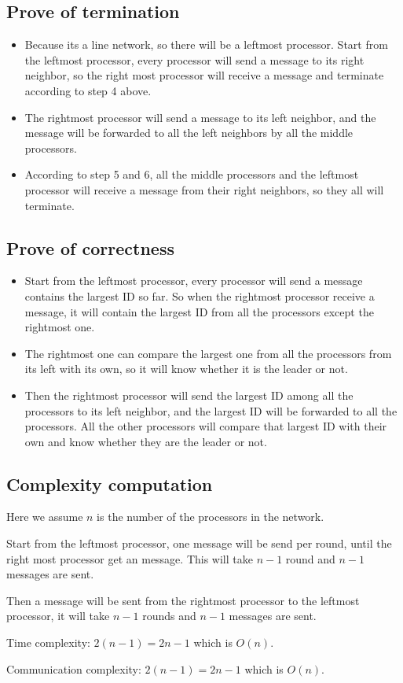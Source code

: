 \documentclass[paper=a4, fontsize=11pt]{scrartcl} %
\numberwithin{equation}{section} %
\numberwithin{figure}{section} %
\numberwithin{table}{section} %
\begin{document}
\subsection*{Prove of termination}
\begin{itemize}
	\item Because its a line network, so there will be a leftmost processor. Start from the leftmost processor, every processor will send a message to its right neighbor, so the right most processor will receive a message and terminate according to step 4 above. 
	\item The rightmost processor will send a message to its left neighbor, and the message will be forwarded to all the left neighbors by all the middle processors. 
	\item According to step 5 and 6, all the middle processors and the leftmost processor will receive a message from their right neighbors, so they all will terminate.
\end{itemize}
\subsection*{Prove of correctness}
\begin{itemize}
	\item Start from the leftmost processor, every processor will send a message contains the largest ID so far. So when the rightmost processor receive a message, it will contain the largest ID from all the processors except the rightmost one. 
	\item The rightmost one can compare the largest one from all the processors from its left with its own, so it will know whether it is the leader or not. 
	\item Then the rightmost processor will send the largest ID among all the processors to its left neighbor, and the largest ID will be forwarded to all the processors. All the other processors will compare that largest ID with their own and know whether they are the leader or not. 
\end{itemize}
\subsection*{Complexity computation}
Here we assume $n$ is the number of the processors in the network.

Start from the leftmost processor, one message will be send per round, until the right most processor get an message. This will take $n - 1$ round and $n - 1$ messages are sent.

Then a message will be sent from the rightmost processor to the leftmost processor, it will take $n - 1$ rounds and $n - 1$ messages are sent.

Time complexity: $2(n - 1) = 2n - 1$ which is $O(n)$.

Communication complexity:  $2(n - 1) = 2n - 1$ which is $O(n)$.
\end{document}
